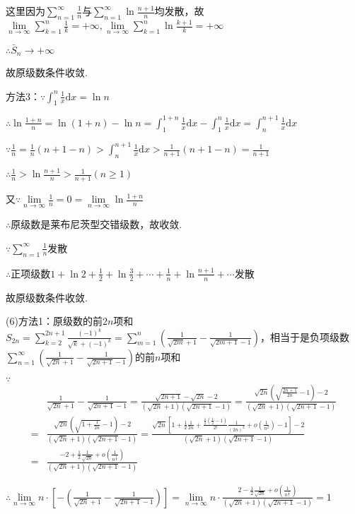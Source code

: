 \documentclass[12pt,UTF8]{ctexart}
\begin{document}
\begin{enumerate}
这里因为$\sum_{n=1}^\infty\frac1n$与$\sum_{n=1}^\infty\ln\frac{n+1}n$均发散，故$\lim\limits_{n\rightarrow\infty}\sum_{k=1}^n\frac1k=+\infty,\lim\limits_{n\rightarrow\infty}\sum_{k=1}^n\ln\frac{k+1}k=+\infty$


$\therefore\bar{S}_n\rightarrow+\infty$

故原级数条件收敛.

方法3：$\because\int_1^n\frac1x\mathrm dx=\ln n$

$\therefore\ln\frac{1+n}n=\ln(1+n)-\ln n=\int_1^{1+n}\frac1x\mathrm dx-\int_1^n\frac1x\mathrm dx=\int_n^{n+1}\frac1x\mathrm dx$

$\because\frac1n=\frac1n(n+1-n)>\int_n^{n+1}\frac1x\mathrm dx>\frac1{n+1}(n+1-n)=\frac1{n+1}$

$\therefore\frac1n>\ln\frac{n+1}n>\frac1{n+1}(n\geq1)$

又$\because\lim\limits_{n\rightarrow\infty}\frac1n=0=\lim\limits_{n\rightarrow\infty}\ln\frac{1+n}n$

$\therefore$原级数是莱布尼茨型交错级数，故收敛.

$\because\sum_{n=1}^\infty\frac1n$发散

$\therefore$正项级数$1+\ln2+\frac12+\ln\frac32+\cdots+\frac1n+\ln\frac{n+1}n+\cdots$发散

故原级数条件收敛.

(6)方法1：原级数的前$2n$项和$S_{2n}=\sum_{k=2}^{2n+1}\frac{(-1)^k}{\sqrt k+(-1)^k}=\sum_{m=1}^n(\frac1{\sqrt{2m}+1}-\frac1{\sqrt{2m+1}-1})$，相当于是负项级数$\sum_{n=1}^\infty(\frac1{\sqrt{2n}+1}-\frac1{\sqrt{2n+1}-1})$的前$n$项和

$\because$
\[\begin{split}
&\frac1{\sqrt{2n}+1}-\frac1{\sqrt{2n+1}-1}=\frac{\sqrt{2n+1}-\sqrt{2n}-2}{(\sqrt{2n}+1)(\sqrt{2n+1}-1)}=\frac{\sqrt{2n}(\sqrt{\frac{2n+1}{2n}}-1)-2}{(\sqrt{2n}+1)(\sqrt{2n+1}-1)}\\
=&\frac{\sqrt{2n}(\sqrt{1+\frac1{2n}}-1)-2}{(\sqrt{2n}+1)(\sqrt{2n+1}-1)}=\frac{\sqrt{2n}[1+\frac12\frac1{2n}+\frac{\frac12(\frac12-1)}{2!}\frac1{(2n)^2}+o(\frac1{n^2})-1]-2}{(\sqrt{2n}+1)(\sqrt{2n+1}-1)}\\
=&\frac{-2+\frac12\frac1{\sqrt{2n}}+o(\frac1{n^{\frac12}})}{(\sqrt{2n}+1)(\sqrt{2n+1}-1)}
\end{split}\]

$\therefore\lim\limits_{n\rightarrow\infty}n\cdot[-(\frac1{\sqrt{2n}+1}-\frac1{\sqrt{2n+1}-1})]=\lim\limits_{n\rightarrow\infty}n\cdot\frac{2-\frac12\frac1{\sqrt{2n}}+o(\frac1{n^{\frac12}})}{(\sqrt{2n}+1)(\sqrt{2n+1}-1)}=1$


\end{enumerate}
\end{document}
